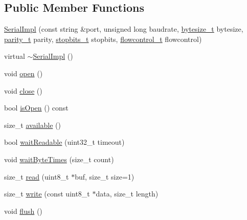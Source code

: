 \subsection*{Public Member Functions}
\begin{DoxyCompactItemize}
\item 
\mbox{\hyperlink{classserial_1_1serial_1_1_serial_1_1_serial_impl_a80885778652ea3c7f7db39ec3f20310c}{Serial\+Impl}} (const string \&port, unsigned long baudrate, \mbox{\hyperlink{namespaceserial_a00b3281fa11cea770c0b0c8a106080f8}{bytesize\+\_\+t}} bytesize, \mbox{\hyperlink{namespaceserial_a8f45d26bf7c9a06659e75b5004a50481}{parity\+\_\+t}} parity, \mbox{\hyperlink{namespaceserial_af5b116611d6628a3aa8f788fdc09f469}{stopbits\+\_\+t}} stopbits, \mbox{\hyperlink{namespaceserial_a93ef57a314b4e562f9eded6c15d34351}{flowcontrol\+\_\+t}} flowcontrol)
\item 
virtual \mbox{\hyperlink{classserial_1_1serial_1_1_serial_1_1_serial_impl_af9f0a13782d7870cf66a49001dcc64e7}{$\sim$\+Serial\+Impl}} ()
\item 
void \mbox{\hyperlink{classserial_1_1serial_1_1_serial_1_1_serial_impl_a279801879f609e1845e3e730f5651aa2}{open}} ()
\item 
void \mbox{\hyperlink{classserial_1_1serial_1_1_serial_1_1_serial_impl_a2608096ba0d17127b17484fc9481833a}{close}} ()
\item 
bool \mbox{\hyperlink{classserial_1_1serial_1_1_serial_1_1_serial_impl_a78f28bc8e63ef24aa805178571f4b384}{is\+Open}} () const
\item 
size\+\_\+t \mbox{\hyperlink{classserial_1_1serial_1_1_serial_1_1_serial_impl_aecd5e068c21b076bcf161f7bf7f415f5}{available}} ()
\item 
bool \mbox{\hyperlink{classserial_1_1serial_1_1_serial_1_1_serial_impl_a4722f7080b15d12a4e00672858c5f0e8}{wait\+Readable}} (uint32\+\_\+t timeout)
\item 
void \mbox{\hyperlink{classserial_1_1serial_1_1_serial_1_1_serial_impl_a039703d806b1c8db071da9a04cf63446}{wait\+Byte\+Times}} (size\+\_\+t count)
\item 
size\+\_\+t \mbox{\hyperlink{classserial_1_1serial_1_1_serial_1_1_serial_impl_ada61c83884f0f6350874fc32e640cbac}{read}} (uint8\+\_\+t $\ast$buf, size\+\_\+t size=1)
\item 
size\+\_\+t \mbox{\hyperlink{classserial_1_1serial_1_1_serial_1_1_serial_impl_a89b50df2562176fd250413833d636d0a}{write}} (const uint8\+\_\+t $\ast$data, size\+\_\+t length)
\item 
void \mbox{\hyperlink{classserial_1_1serial_1_1_serial_1_1_serial_impl_afe873a403bcca3956437d95aa55c4d06}{flush}} ()

\end{DoxyCompactItemize}
